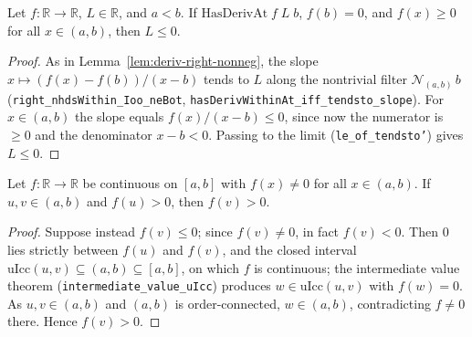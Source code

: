 \begin{lemma}
    \label{lem:deriv-left-nonpos}
    \leanok
    Let $f : \mathbb{R} \to \mathbb{R}$, $L \in \mathbb{R}$, and $a < b$.
    If $\mathrm{HasDerivAt}\;f\;L\;b$, $f(b) = 0$, and $f(x) \ge 0$ for all
    $x \in (a,b)$, then $L \le 0$.
\end{lemma}
\begin{proof}
    As in Lemma~\ref{lem:deriv-right-nonneg}, the slope
    $x \mapsto (f(x) - f(b))/(x - b)$ tends to $L$ along the nontrivial filter
    $\mathcal{N}_{(a,b)}\,b$ (\texttt{right\_nhdsWithin\_Ioo\_neBot},
    \texttt{hasDerivWithinAt\_iff\_tendsto\_slope}). For $x \in (a,b)$ the slope
    equals $f(x)/(x - b) \le 0$, since now the numerator is $\ge 0$ and the
    denominator $x - b < 0$. Passing to the limit (\texttt{le\_of\_tendsto'})
    gives $L \le 0$.
\end{proof}

\begin{lemma}
    \label{lem:no-interior-zero-forces-sign}
    \leanok
    Let $f : \mathbb{R} \to \mathbb{R}$ be continuous on $[a,b]$ with
    $f(x) \ne 0$ for all $x \in (a,b)$. If $u, v \in (a,b)$ and $f(u) > 0$, then
    $f(v) > 0$.
\end{lemma}
\begin{proof}
    Suppose instead $f(v) \le 0$; since $f(v) \ne 0$, in fact $f(v) < 0$. Then
    $0$ lies strictly between $f(u)$ and $f(v)$, and the closed interval
    $\mathrm{uIcc}(u,v) \subseteq (a,b) \subseteq [a,b]$, on which $f$ is
    continuous; the intermediate value theorem
    (\texttt{intermediate\_value\_uIcc}) produces $w \in \mathrm{uIcc}(u,v)$
    with $f(w) = 0$. As $u, v \in (a,b)$ and $(a,b)$ is order-connected,
    $w \in (a,b)$, contradicting $f \ne 0$ there. Hence $f(v) > 0$.
\end{proof}

